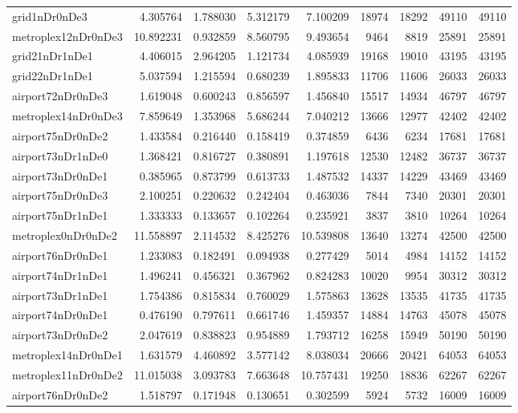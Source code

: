 \begin{longtable}{|l|r|r|r|r|r|r|r|r|}
grid1nDr0nDe3 & 4.305764 & 1.788030 & 5.312179 & 7.100209 & 18974 & 18292 & 49110 & 49110 \\
metroplex12nDr0nDe3 & 10.892231 & 0.932859 & 8.560795 & 9.493654 & 9464 & 8819 & 25891 & 25891 \\
grid21nDr1nDe1 & 4.406015 & 2.964205 & 1.121734 & 4.085939 & 19168 & 19010 & 43195 & 43195 \\
grid22nDr1nDe1 & 5.037594 & 1.215594 & 0.680239 & 1.895833 & 11706 & 11606 & 26033 & 26033 \\
airport72nDr0nDe3 & 1.619048 & 0.600243 & 0.856597 & 1.456840 & 15517 & 14934 & 46797 & 46797 \\
metroplex14nDr0nDe3 & 7.859649 & 1.353968 & 5.686244 & 7.040212 & 13666 & 12977 & 42402 & 42402 \\
airport75nDr0nDe2 & 1.433584 & 0.216440 & 0.158419 & 0.374859 & 6436 & 6234 & 17681 & 17681 \\
airport73nDr1nDe0 & 1.368421 & 0.816727 & 0.380891 & 1.197618 & 12530 & 12482 & 36737 & 36737 \\
airport73nDr0nDe1 & 0.385965 & 0.873799 & 0.613733 & 1.487532 & 14337 & 14229 & 43469 & 43469 \\
airport75nDr0nDe3 & 2.100251 & 0.220632 & 0.242404 & 0.463036 & 7844 & 7340 & 20301 & 20301 \\
airport75nDr1nDe1 & 1.333333 & 0.133657 & 0.102264 & 0.235921 & 3837 & 3810 & 10264 & 10264 \\
metroplex0nDr0nDe2 & 11.558897 & 2.114532 & 8.425276 & 10.539808 & 13640 & 13274 & 42500 & 42500 \\
airport76nDr0nDe1 & 1.233083 & 0.182491 & 0.094938 & 0.277429 & 5014 & 4984 & 14152 & 14152 \\
airport74nDr1nDe1 & 1.496241 & 0.456321 & 0.367962 & 0.824283 & 10020 & 9954 & 30312 & 30312 \\
airport73nDr1nDe1 & 1.754386 & 0.815834 & 0.760029 & 1.575863 & 13628 & 13535 & 41735 & 41735 \\
airport74nDr0nDe1 & 0.476190 & 0.797611 & 0.661746 & 1.459357 & 14884 & 14763 & 45078 & 45078 \\
airport73nDr0nDe2 & 2.047619 & 0.838823 & 0.954889 & 1.793712 & 16258 & 15949 & 50190 & 50190 \\
metroplex14nDr0nDe1 & 1.631579 & 4.460892 & 3.577142 & 8.038034 & 20666 & 20421 & 64053 & 64053 \\
metroplex11nDr0nDe2 & 11.015038 & 3.093783 & 7.663648 & 10.757431 & 19250 & 18836 & 62267 & 62267 \\
airport76nDr0nDe2 & 1.518797 & 0.171948 & 0.130651 & 0.302599 & 5924 & 5732 & 16009 & 16009 \\

\end{longtable}
